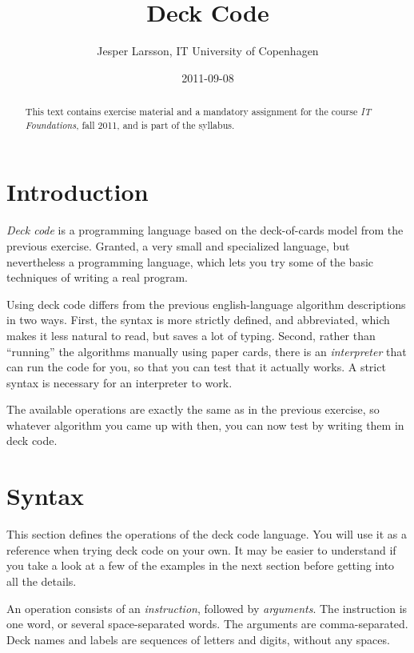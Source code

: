 \documentclass[a4paper,twoside]{tufte-handout}
\title{Deck Code}
\author{Jesper Larsson, IT University of Copenhagen}
\date{2011-09-08}
\begin{document}
\maketitle

\begin{abstract}
  This text contains exercise material and a mandatory assignment for
  the course \emph{IT Foundations}, fall 2011, and is part of the
  syllabus.
\end{abstract}

\section{Introduction}\label{sec-intro}

\emph{Deck code} is a programming language based on the deck-of-cards
model from the previous exercise. Granted, a very small and
specialized language, but nevertheless a programming language, which
lets you try some of the basic techniques of writing a real program.

Using deck code differs from the previous english-language algorithm
descriptions in two ways. First, the syntax is more strictly defined,
and abbreviated, which makes it less natural to read, but saves a
lot of typing. Second, rather than ``running'' the algorithms manually
using paper cards, there is an \emph{interpreter} that can run the
code for you, so that you can test that it actually works. A strict
syntax is necessary for an interpreter to work.

The available operations are exactly the same as in the previous
exercise, so whatever algorithm you came up with then, you can now
test by writing them in deck code.

\section{Syntax}\label{sec-syntax}

This section defines the operations of the deck code language. You
will use it as a reference when trying deck code on your own. It may
be easier to understand if you take a look at a few of the examples in
the next section before getting into all the details.

An operation consists of an \emph{instruction}, followed by
\emph{arguments}. The instruction is one word, or several
space-separated words. The arguments are comma-separated. Deck names
and labels are sequences of letters and digits, without any spaces.
\end{document}
